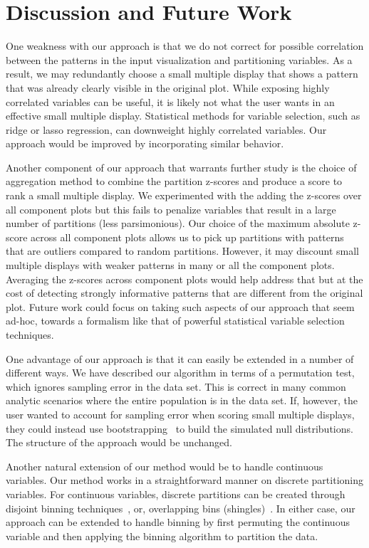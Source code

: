 \section{Discussion and Future Work}
\label{sec:discussion}
One weakness with our approach is that we do not correct for possible correlation between the patterns in the input visualization and partitioning variables. As a result, we may redundantly choose a small multiple display that shows a pattern that was already clearly visible in the original plot. While exposing highly correlated variables can be useful, it is likely not what the user wants in an effective small multiple display. Statistical methods for variable selection, such as ridge or lasso regression, can downweight highly correlated variables. Our approach would be improved by incorporating similar behavior. 

Another component of our approach that warrants further study is the choice of aggregation method to combine the partition z-scores and produce a score to rank a small multiple display. We experimented with the adding the z-scores over all component plots but this fails to penalize variables that result in a large number of partitions (less parsimonious). Our choice of the maximum absolute z-score across all component plots allows us to pick up partitions with patterns that are outliers compared to random partitions. However, it may discount small multiple displays with weaker patterns in many or all the component plots. Averaging the z-scores across component plots would help address that but at the cost of detecting strongly informative patterns that are different from the original plot. Future work could focus on taking such aspects of our approach that seem ad-hoc, towards a formalism like that of powerful statistical variable selection techniques.%

One advantage of our approach is that it can easily be extended in a number of different ways. We have described our algorithm in terms of a permutation test, which ignores sampling error in the data set. This is correct in many common analytic scenarios where the entire population is in the data set. If, however, the user wanted to account for sampling error when scoring small multiple displays, they could instead use bootstrapping~\cite{Efron1994} to build the simulated null distributions. The structure of the approach would be unchanged.

Another natural extension of our method would be to handle continuous variables. Our method works in a straightforward manner on discrete partitioning variables. For continuous variables, discrete partitions can be created through disjoint binning techniques~\cite{Freedman1981,Scott2009}, or, overlapping bins (shingles)~\cite{Becker1996}. In either case, our approach can be extended to handle binning by first permuting the continuous variable and then applying the binning algorithm to partition the data.

